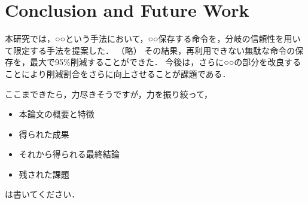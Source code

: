 \chapter{Conclusion and Future Work}
本研究では，○○という手法において，○○保存する命令を，分岐の信頼性を用いて限定する手法を提案した．
（略）
その結果，再利用できない無駄な命令の保存を，最大で95\%削減することができた．
今後は，さらに○○の部分を改良することにより削減割合をさらに向上させることが課題である．

ここまできたら，力尽きそうですが，力を振り絞って，
\begin{itemize}
\item 本論文の概要と特徴
\item 得られた成果
\item それから得られる最終結論
\item 残された課題
\end{itemize}
は書いてください．
